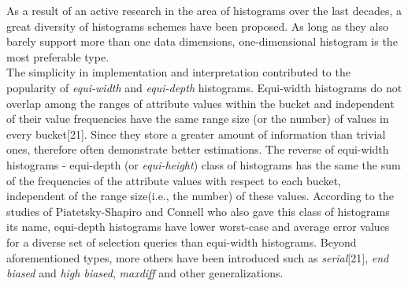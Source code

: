 \documentclass[10pt, conference, compsocconf]{IEEEtran}
\begin{document}

As a result of an active research in the area of histograms over the last decades, a great diversity of histograms schemes have been proposed. %
As long as they also barely support more than one data dimensions, one-dimensional histogram is the most preferable type. \\The simplicity in implementation and interpretation contributed to the popularity of \textit{equi-width} and \textit{equi-depth} histograms. Equi-width histograms do not overlap among the ranges of attribute values within the bucket and independent of their value frequencies have the same range size (or the number) of values in every bucket[21]. Since they store a greater amount of information than trivial ones, therefore often demonstrate better estimations. The reverse of equi-width histograms - equi-depth (or \textit{equi-height}) class of histograms has the same the sum of the frequencies of the attribute values with respect to each bucket, independent of the range size(i.e., the number) of these values. According to the studies of Piatetsky-Shapiro and Connell who also gave this class of histograms its name, equi-depth histograms have lower worst-case and average error values for a diverse set of selection queries than equi-width histograms.
Beyond aforementioned types, more others have been introduced such as \textit{serial}[21], \textit{end biased} and \textit{high biased}, \textit{maxdiff} and other generalizations. 
\end{document}
